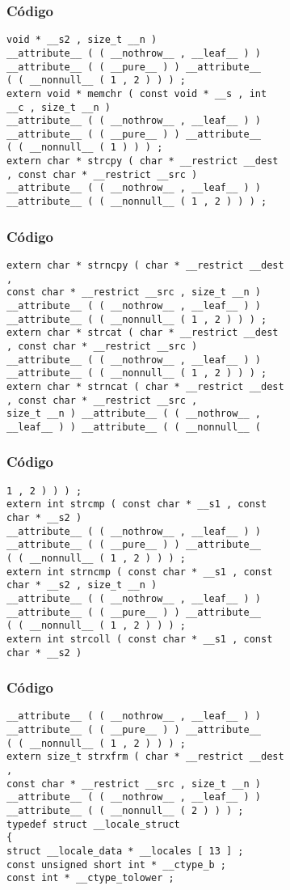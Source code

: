 \documentclass{beamer}
\begin{document}
\begin{frame}[fragile]
\frametitle{C\'odigo}
\begin{verbatim}
void * __s2 , size_t __n ) 
__attribute__ ( ( __nothrow__ , __leaf__ ) ) 
__attribute__ ( ( __pure__ ) ) __attribute__ 
( ( __nonnull__ ( 1 , 2 ) ) ) ; 
extern void * memchr ( const void * __s , int 
__c , size_t __n ) 
__attribute__ ( ( __nothrow__ , __leaf__ ) ) 
__attribute__ ( ( __pure__ ) ) __attribute__ 
( ( __nonnull__ ( 1 ) ) ) ; 
extern char * strcpy ( char * __restrict __dest 
, const char * __restrict __src ) 
__attribute__ ( ( __nothrow__ , __leaf__ ) ) 
__attribute__ ( ( __nonnull__ ( 1 , 2 ) ) ) ; 
\end{verbatim}
\end{frame}
\begin{frame}[fragile]
\frametitle{C\'odigo}
\begin{verbatim}
extern char * strncpy ( char * __restrict __dest 
, 
const char * __restrict __src , size_t __n ) 
__attribute__ ( ( __nothrow__ , __leaf__ ) ) 
__attribute__ ( ( __nonnull__ ( 1 , 2 ) ) ) ; 
extern char * strcat ( char * __restrict __dest 
, const char * __restrict __src ) 
__attribute__ ( ( __nothrow__ , __leaf__ ) ) 
__attribute__ ( ( __nonnull__ ( 1 , 2 ) ) ) ; 
extern char * strncat ( char * __restrict __dest 
, const char * __restrict __src , 
size_t __n ) __attribute__ ( ( __nothrow__ , 
__leaf__ ) ) __attribute__ ( ( __nonnull__ ( 
\end{verbatim}
\end{frame}
\begin{frame}[fragile]
\frametitle{C\'odigo}
\begin{verbatim}
1 , 2 ) ) ) ; 
extern int strcmp ( const char * __s1 , const 
char * __s2 ) 
__attribute__ ( ( __nothrow__ , __leaf__ ) ) 
__attribute__ ( ( __pure__ ) ) __attribute__ 
( ( __nonnull__ ( 1 , 2 ) ) ) ; 
extern int strncmp ( const char * __s1 , const 
char * __s2 , size_t __n ) 
__attribute__ ( ( __nothrow__ , __leaf__ ) ) 
__attribute__ ( ( __pure__ ) ) __attribute__ 
( ( __nonnull__ ( 1 , 2 ) ) ) ; 
extern int strcoll ( const char * __s1 , const 
char * __s2 ) 
\end{verbatim}
\end{frame}
\begin{frame}[fragile]
\frametitle{C\'odigo}
\begin{verbatim}
__attribute__ ( ( __nothrow__ , __leaf__ ) ) 
__attribute__ ( ( __pure__ ) ) __attribute__ 
( ( __nonnull__ ( 1 , 2 ) ) ) ; 
extern size_t strxfrm ( char * __restrict __dest 
, 
const char * __restrict __src , size_t __n ) 
__attribute__ ( ( __nothrow__ , __leaf__ ) ) 
__attribute__ ( ( __nonnull__ ( 2 ) ) ) ; 
typedef struct __locale_struct 
{ 
struct __locale_data * __locales [ 13 ] ; 
const unsigned short int * __ctype_b ; 
const int * __ctype_tolower ; 
\end{verbatim}
\end{frame}
\end{document}
